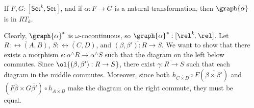 \documentclass{lmcs}
\theoremstyle{plain}\newtheorem{satz}[thm]{Satz}
\newcommand{\set}{\mathsf{Set}}
\begin{document}
\begin{lem}\label{lem:graph-reln-functors}
If $F,G : [\set^k,\set]$, and if $\alpha : F \to G$ is a natural
transformation, then $\graph{\alpha}$ is in $RT_k$.
\end{lem}
\proof
Clearly, $\graph{\alpha}^*$ is $\omega$-cocontinuous, so
$\graph{\alpha}^* : [\rel^k,\rel]$. Let $\overline{R :
  \rel(A, B)}$, $\overline{S : \rel(C, D)}$, and $\overline{(\beta,
  \beta') : R \to S}$. We want to show that there exists a morphism
$\epsilon : \alpha^\wedge\overline{R} \to \alpha^\wedge\overline{S}$
such that the diagram on the left below commutes. Since
$\ol{(\beta,\beta') : R \to S}$, there exist $\overline{\gamma : R \to
  S}$ such that each diagram in the middle commutes.
Moreover, since both $h_{\overline{C \times D}} \circ
F(\overline{\beta \times \beta'})$ and $(F\overline{\beta} \times
G\overline{\beta'}) \circ h_{\overline{A \times B}}$ make the diagram
on the right commute, they must be equal.
\end{document}
